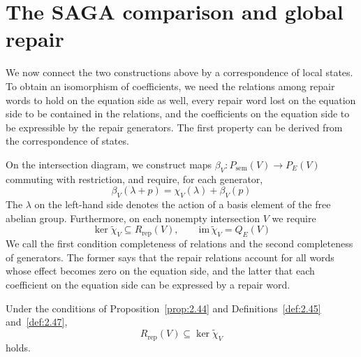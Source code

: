 \section{The SAGA comparison and global repair}\label{sec:2.10}

We now connect the two constructions above by a correspondence of local states. To
obtain an isomorphism of coefficients, we need the relations among repair words to hold
on the equation side as well, every repair word lost on the equation side to be
contained in the relations, and the coefficients on the equation side to be expressible
by the repair generators. The first property can be derived from the correspondence of
states.

\begin{definition}\label{def:2.47}

On the intersection diagram, we construct maps
$\beta_V:P_{\mathrm{sem}}(V)\to P_E(V)$ commuting with restriction, and require, for
each generator,
\begin{equation*}
\beta_V(\lambda+p)=\chi_V(\lambda)+\beta_V(p)
\tag{2.31}\label{eq:2.31}
\end{equation*}
The $\lambda$ on the left-hand side denotes the action of a basis element of the free
abelian group. Furthermore, on each nonempty intersection $V$ we require
\begin{equation*}
\ker\widetilde\chi_V\subseteq R_{\mathrm{rep}}(V),
\qquad
\mathrm{im}\,\widetilde\chi_V=Q_E(V)
\tag{2.32}\label{eq:2.32}
\end{equation*}
We call the first condition completeness of relations and the second completeness of
generators. The former says that the repair relations account for all words whose effect
becomes zero on the equation side, and the latter that each coefficient on the equation
side can be expressed by a repair word.

\end{definition}

\begin{lemma}\label{lem:2.48}

Under the conditions of Proposition~\ref{prop:2.44} and
Definitions~\ref{def:2.45} and~\ref{def:2.47},
\begin{equation*}
R_{\mathrm{rep}}(V)\subseteq\ker\widetilde\chi_V
\tag{2.33}\label{eq:2.33}
\end{equation*}
holds.

\end{lemma}

